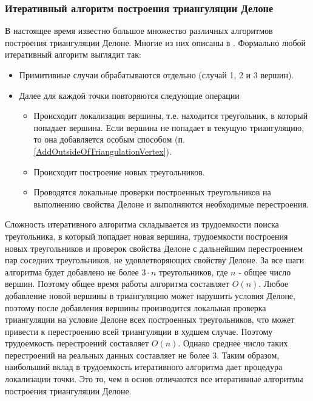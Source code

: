 \documentclass{fefu}
\begin{document}
\subsubsection{Итеративный алгоритм построения триангуляции Делоне}
В настоящее время известно большое множество различных алгоритмов построения триангуляции Делоне. Многие из них описаны
в \cite{Skvorcov}. Формально любой итеративный алгоритм выглядит так:
\begin{itemize}
    \item Примитивные случаи обрабатываются отдельно (случай 1, 2 и 3 вершин).
    \item Далее для каждой точки повторяются следующие операции
    \begin{itemize}
        \item Происходит локализация вершины, т.е. находится треугольник, в который попадает вершина. Если вершина не попадает
        в текущую триангуляцию, то она добавляется особым способом (п. \ref{AddOutsideOfTriangulationVertex}).
        \item Происходит построение новых треугольников.
        \item Проводятся локальные проверки построенных треугольников на выполнению свойства Делоне и выполняются
        необходимые перестроения.
    \end{itemize}
\end{itemize}
Сложность итеративного алгоритма складывается из трудоемкости поиска треугольника, в который попадает новая вершина,
трудоемкости построения новых треугольников и проверок свойства Делоне с дальнейшим перестроением пар соседних
треугольников, не удовлетворяющих свойству Делоне. За все шаги алгоритма будет добавлено не более $3 \cdot n$
треугольников, где $n$ - общее число вершин. Поэтому общее время работы алгоритма составляет $O(n)$. Любое добавление
новой вершины в триангуляцию может нарушить условия Делоне, поэтому после добавления вершины производится локальная
проверка триангуляции на условие Делоне всех построенных треугольников, что может привести к перестроению всей
триангуляции в худшем случае. Поэтому трудоемкость перестроений составляет $O(n)$. Однако среднее число таких перестроений
на реальных данных составляет не более 3\cite{Skvorcov2}. Таким образом, наибольший вклад в трудоемкость итеративного
алгоритма дает процедура локализации точки. Это то, чем в основ отличаются все итеративные алгоритмы построения
триангуляции Делоне.
\end{document}
